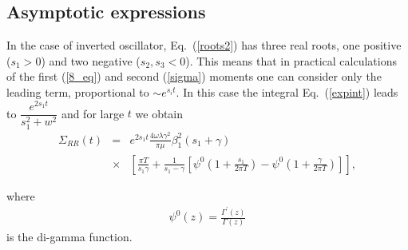 \documentclass[preprint,review,12pt]{elsarticle}
\begin{document}
\subsection{Asymptotic expressions }

  In the case of inverted oscillator, Eq.~(\ref{roots2}) has three real roots, one positive ($s_1>0$) and two negative ($s_2,s_3<0$).
  This means that in practical calculations of the first (\ref{8_eq}) and second (\ref{sigma}) moments one can
  consider only the leading term,
  proportional to $\sim e^{s_i t}$.
  In this case the integral Eq.~(\ref{expint}) leads to $\dfrac{e^{2 s_1 t}}{s_1^2+w^2}$ and for large $t$ we obtain
  \begin{eqnarray}
  \Sigma_{RR}(t)&=& e^{2 s_1 t}\frac{4 \omega \lambda\gamma^2}{\pi \mu}\beta_1^2(s_1+\gamma) \nonumber\\
  &\times& \left[\frac{\pi T}{s_1\gamma}+\frac{1}{s_1-\gamma}
  \left[\psi^{0}\left(1+\frac{s_1}{2\pi T}\right)-\psi^{0}\left(1+\frac{\gamma}{2\pi T}\right)\right]\right],
  \label{sigmaAs}
  \end{eqnarray}

  where
  \begin{eqnarray}
  \psi^{0}(z)=\frac{\Gamma^{'}(z)}{\Gamma(z)}
  \end{eqnarray}
  is the di-gamma function.
\end{document}
